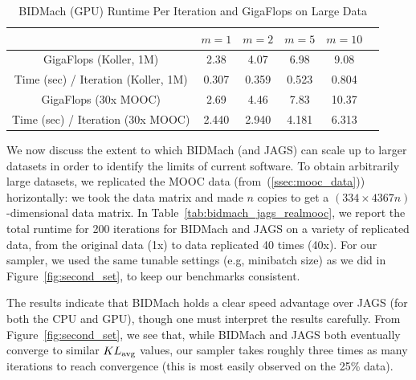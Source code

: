 \documentclass{article} %
\begin{document}
%
%
\begin{table}[t]
\small
\caption{BIDMach (GPU) Runtime Per Iteration and GigaFlops on Large Data}
\label{tab:tradeoff}
\begin{center}
\begin{tabular}{ |c|c|c|c|c|c| } 
\hline
               & $m=1$ & $m=2$ & $m=5$ & $m=10$ \\
\hline \hline
GigaFlops (Koller, 1M)               & 2.38  & 4.07  &  6.98  &  9.08  \\ 
Time (sec) / Iteration (Koller, 1M)  & 0.307 & 0.359 &  0.523 &  0.804 \\
\hline
GigaFlops (30x MOOC)              & 2.69  & 4.46  & 7.83  & 10.37   \\ 
Time (sec) / Iteration (30x MOOC) & 2.440 & 2.940 & 4.181 & 6.313   \\
\hline
\end{tabular}
\end{center}
\end{table}

We now discuss the extent to which BIDMach (and JAGS) can scale up to larger datasets in order to
identify the limits of current software. To obtain arbitrarily large datasets, we replicated the
MOOC data (from~(\ref{ssec:mooc_data})) horizontally: we took the data matrix and made $n$ copies to
get a $(334 \times 4367n)$-dimensional data matrix. In Table~\ref{tab:bidmach_jags_realmooc}, we
report the total runtime for 200 iterations for BIDMach and JAGS on a variety of replicated data,
from the original data (1x) to data replicated 40 times (40x). For our sampler, we used the same
tunable settings (e.g, minibatch size) as we did in Figure~\ref{fig:second_set}, to keep our
benchmarks consistent.

The results indicate that BIDMach holds a clear speed advantage over JAGS (for both the CPU and
GPU), though one must interpret the results carefully. From Figure~\ref{fig:second_set}, we see
that, while BIDMach and JAGS both eventually converge to similar $KL_{\rm avg}$ values, our sampler
takes roughly three times as many iterations to reach convergence (this is most easily observed on
the 25\% data).
\end{document}
